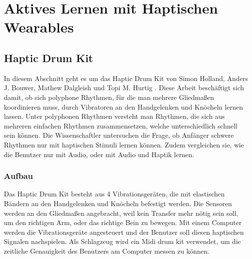 \documentclass[ngerman,runningheads,a4paper]{llncs}
\begin{document}


\section{Aktives Lernen mit Haptischen Wearables}

\subsection{Haptic Drum Kit}
In diesem Abschnitt geht es um das Haptic Drum Kit von Simon Holland, Anders J. Bouwer, Mathew Dalgleish und Topi M. Hurtig \cite{10.1145/1709886.1709892}
.
Diese Arbeit beschäftigt sich damit, ob sich polyphone Rhythmen, für die man mehrere Gliedmaßen koordinieren muss, durch Vibratoren an den Handgelenken und Knöcheln lernen lassen.
Unter polyphonen Rhythmen versteht man Rhythmen, die sich aus mehreren einfachen Rhythmen zusammensetzen, welche unterschiedlich schnell sein können.
Die Wissenschaftler untersuchen die Frage, ob Anfänger schwere Rhythmen nur mit haptischen Stimuli lernen können.
Zudem vergleichen sie, wie die Benutzer nur mit Audio, oder mit Audio und Haptik lernen.

\subsubsection{Aufbau}
Das Haptic Drum Kit besteht aus 4 Vibrationsgeräten, die mit elastischen Bändern an den Handgelenken und Knöcheln befestigt werden.
Die Sensoren werden an den Gliedmaßen angebracht, weil kein Transfer mehr nötig sein soll, um den richtigen Arm, oder das richtige Bein zu bewegen.
Mit einem Computer werden die Vibrationsgeräte angesteuert und der Benutzer soll diesen haptischen Signalen nachspielen.
Als Schlagzeug wird ein Midi drum kit verwendet, um die zeitliche Genauigkeit des Benutzers am Computer messen zu können.
\end{document}

